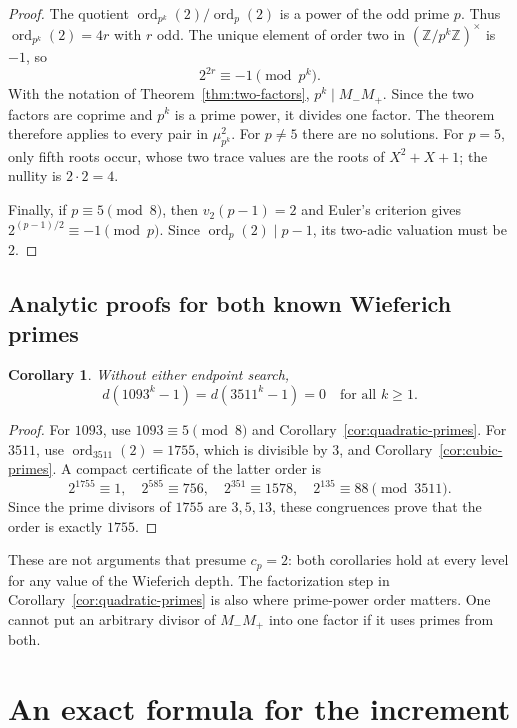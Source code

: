 \documentclass[a4paper]{article}
\newtheorem{corollary}[theorem]{Corollary}
\newcommand{\Z}{\mathbb Z}
\newcommand{\ord}{\operatorname{ord}}
\begin{document}
\begin{proof}
The quotient $\ord_{p^k}(2)/\ord_p(2)$ is a power of the odd
prime $p$.  Thus $\ord_{p^k}(2)=4r$ with $r$ odd.
The unique element of order two in $(\Z/p^k\Z)^\times$ is $-1$, so
\[
 2^{2r}\equiv-1\pmod{p^k}.
\]
With the notation of Theorem~\ref{thm:two-factors},
$p^k\mid M_-M_+$.  Since the two factors are coprime and $p^k$ is a
prime power, it divides one factor.
The theorem therefore applies to every pair in $\mu_{p^k}^2$.
For $p\ne5$ there are no solutions.
For $p=5$, only fifth roots occur, whose two trace values are the
roots of $X^2+X+1$; the nullity is $2\cdot2=4$.

Finally, if $p\equiv5\pmod8$, then $v_2(p-1)=2$ and Euler's
criterion gives $2^{(p-1)/2}\equiv-1\pmod p$.
Since $\ord_p(2)\mid p-1$, its two-adic valuation must be $2$.
\end{proof}

\subsection{Analytic proofs for both known Wieferich primes}

\begin{corollary}\label{cor:known-analytic}
Without either endpoint search,
\[
 \boxed{\ d(1093^k-1)=d(3511^k-1)=0
            \quad\text{for all }k\geq1.\ }
\]
\end{corollary}

\begin{proof}
For $1093$, use $1093\equiv5\pmod8$ and
Corollary~\ref{cor:quadratic-primes}.
For $3511$, use $\ord_{3511}(2)=1755$, which is divisible by $3$,
and Corollary~\ref{cor:cubic-primes}.
A compact certificate of the latter order is
\[
 2^{1755}\equiv1,\quad
 2^{585}\equiv756,\quad
 2^{351}\equiv1578,\quad
 2^{135}\equiv88\pmod{3511}.
\]
Since the prime divisors of $1755$ are $3,5,13$, these congruences
prove that the order is exactly $1755$.
\end{proof}

These are not arguments that presume $c_p=2$: both corollaries hold
at every level for any value of the Wieferich depth.
The factorization step in Corollary~\ref{cor:quadratic-primes} is also
where prime-power order matters.  One cannot put an arbitrary divisor
of $M_-M_+$ into one factor if it uses primes from both.

\section{An exact formula for the increment}\label{sec:increment}
\end{document}
